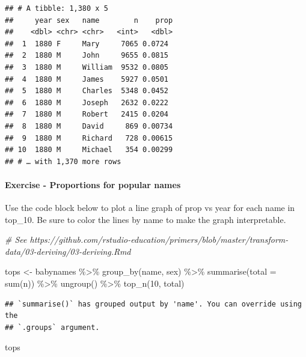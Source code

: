 \documentclass[
]{article}
\newenvironment{Shaded}{\begin{snugshade}}{\end{snugshade}}
\newcommand{\AttributeTok}[1]{\textcolor[rgb]{0.77,0.63,0.00}{#1}}
\newcommand{\CommentTok}[1]{\textcolor[rgb]{0.56,0.35,0.01}{\textit{#1}}}
\newcommand{\DecValTok}[1]{\textcolor[rgb]{0.00,0.00,0.81}{#1}}
\newcommand{\FunctionTok}[1]{\textcolor[rgb]{0.00,0.00,0.00}{#1}}
\newcommand{\NormalTok}[1]{#1}
\newcommand{\OtherTok}[1]{\textcolor[rgb]{0.56,0.35,0.01}{#1}}
\newcommand{\SpecialCharTok}[1]{\textcolor[rgb]{0.00,0.00,0.00}{#1}}
\begin{document}
\begin{verbatim}
## # A tibble: 1,380 x 5
##     year sex   name        n    prop
##    <dbl> <chr> <chr>   <int>   <dbl>
##  1  1880 F     Mary     7065 0.0724 
##  2  1880 M     John     9655 0.0815 
##  3  1880 M     William  9532 0.0805 
##  4  1880 M     James    5927 0.0501 
##  5  1880 M     Charles  5348 0.0452 
##  6  1880 M     Joseph   2632 0.0222 
##  7  1880 M     Robert   2415 0.0204 
##  8  1880 M     David     869 0.00734
##  9  1880 M     Richard   728 0.00615
## 10  1880 M     Michael   354 0.00299
## # … with 1,370 more rows
\end{verbatim}

\hypertarget{exercise---proportions-for-popular-names}{%
\paragraph{Exercise - Proportions for popular
names}\label{exercise---proportions-for-popular-names}}

Use the code block below to plot a line graph of prop vs year for each
name in top\_10. Be sure to color the lines by name to make the graph
interpretable.

\begin{Shaded}
\begin{Highlighting}[]
\CommentTok{\# See https://github.com/rstudio{-}education/primers/blob/master/transform{-}data/03{-}deriving/03{-}deriving.Rmd}

\NormalTok{tops }\OtherTok{\textless{}{-}}\NormalTok{ babynames }\SpecialCharTok{\%\textgreater{}\%} 
  \FunctionTok{group\_by}\NormalTok{(name, sex) }\SpecialCharTok{\%\textgreater{}\%} 
  \FunctionTok{summarise}\NormalTok{(}\AttributeTok{total =} \FunctionTok{sum}\NormalTok{(n)) }\SpecialCharTok{\%\textgreater{}\%} 
  \FunctionTok{ungroup}\NormalTok{() }\SpecialCharTok{\%\textgreater{}\%} 
  \FunctionTok{top\_n}\NormalTok{(}\DecValTok{10}\NormalTok{, total)}
\end{Highlighting}
\end{Shaded}

\begin{verbatim}
## `summarise()` has grouped output by 'name'. You can override using the
## `.groups` argument.
\end{verbatim}

\begin{Shaded}
\begin{Highlighting}[]
\NormalTok{tops}
\end{Highlighting}
\end{Shaded}
\end{document}
